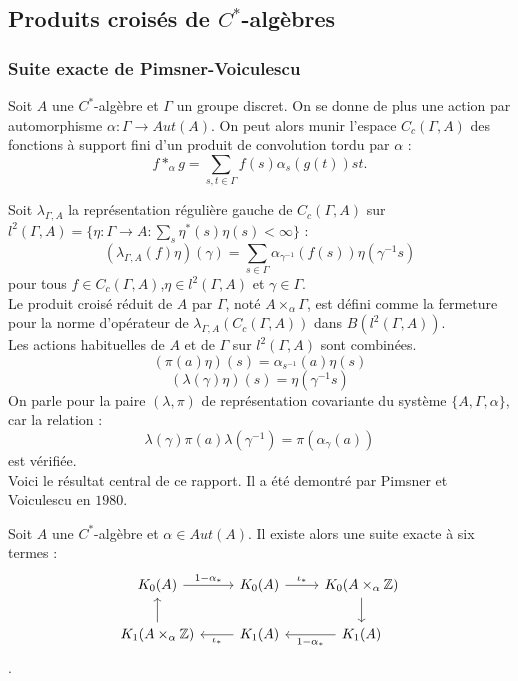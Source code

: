 \subsection{Produits croisés de $C^*$-algèbres}

\subsubsection{Suite exacte de Pimsner-Voiculescu}

Soit $A$ une $C^*$-algèbre et $\Gamma$ un groupe discret. On se donne de plus une action par automorphisme $\alpha : \Gamma \rightarrow Aut(A)$. On peut alors munir l'espace $C_c(\Gamma,A)$ des fonctions à support fini d'un produit de convolution tordu par $\alpha$ :
\[f*_\alpha g = \sum_{s,t \in \Gamma} f(s)\alpha_s(g(t))st.\]

Soit $\lambda_{\Gamma,A}$ la représentation régulière gauche de $C_c(\Gamma,A)$ sur $l^2(\Gamma,A)=\{\eta : \Gamma \rightarrow A : \sum_s \eta^*(s)\eta(s) <\infty\}$ :
\[(\lambda_{\Gamma,A}(f)\eta)(\gamma) = \sum_{s\in \Gamma} \alpha_{\gamma^{-1}}(f(s))\eta(\gamma^{-1}s)\]
pour tous $f\in C_c(\Gamma,A)$,$\eta \in l^2(\Gamma,A)$ et $\gamma \in \Gamma$. \\

Le produit croisé réduit de $A$ par $\Gamma$, noté $A\times_\alpha \Gamma$, est défini comme la fermeture pour la norme d'opérateur de $\lambda_{\Gamma,A}(C_c(\Gamma,A))$ dans $B(l^2(\Gamma,A))$.\\

Les actions habituelles de $A$ et de $\Gamma$ sur $l^2(\Gamma,A)$ sont combinées.
\[(\pi(a)\eta)(s) = \alpha_{s^{-1}}(a)\eta(s)\]
\[(\lambda(\gamma)\eta)(s)=\eta(\gamma^{-1}s)\]
 On parle pour la paire $(\lambda, \pi)$ de représentation covariante du système $\{A,\Gamma,\alpha\}$, car la relation :
\[\lambda(\gamma)\pi(a)\lambda(\gamma^{-1})=\pi(\alpha_\gamma(a))\]
est vérifiée.\\

Voici le résultat central de ce rapport. Il a été demontré par Pimsner et Voiculescu en $1980$.~\cite{PV}
\begin{thm}\label{PV}
Soit $A$ une $C^*$-algèbre et $\alpha \in Aut(A)$. Il existe alors une suite exacte à six termes :\\
\[\begin{tikzcd}
 K_0(A) \arrow{r}{1-\alpha_*} & K_0(A)  \arrow{r}{\iota_*}  &    K_0(A\times_\alpha \Z)  \arrow{d}  \\
 K_1(A\times_\alpha \Z) \arrow{u} & K_1(A)  \arrow{l}{\iota_*} &    K_1(A) \arrow{l}{1-\alpha_*} 
\end{tikzcd}\]
.
\end{thm}

